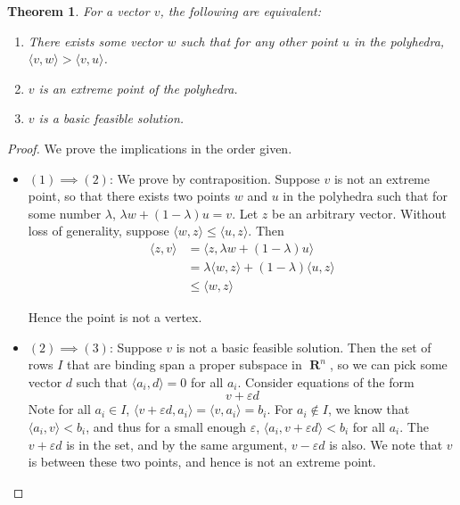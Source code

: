 \documentclass{report}
\DeclareMathOperator{\real}{\mathbf{R}}
\newtheorem{theorem}{Theorem}[chapter]
\begin{document}
    \begin{theorem}
        For a vector $v$, the following are equivalent:

        \begin{enumerate}
            \item There exists some vector $w$ such that for any other point $u$ in the polyhedra,
            $\langle v, w \rangle > \langle v, u \rangle$.
            \item $v$ is an extreme point of the polyhedra.
            \item $v$ is a basic feasible solution.
        \end{enumerate}
    \end{theorem}
    \begin{proof}
        We prove the implications in the order given.

        \begin{itemize}
            \item $(1) \implies (2)$: We prove by contraposition. Suppose $v$ is not an extreme point, so that there exists two points $w$ and $u$ in the polyhedra such that for some number $\lambda$, $\lambda w + (1 - \lambda)u = v$. Let $z$ be an arbitrary vector. Without loss of generality, suppose $\langle w, z \rangle \leq \langle u, z \rangle$. Then
            \begin{align*}
                \langle z, v \rangle &= \langle z, \lambda w + (1 - \lambda) u \rangle\\
                                     &= \lambda \langle w, z \rangle + (1 - \lambda) \langle u, z \rangle\\
                                     &\leq \langle w , z \rangle
            \end{align*}

            Hence the point is not a vertex.

            \item $(2) \implies (3)$: Suppose $v$ is not a basic feasible solution. Then the set of rows $I$ that are binding span a proper subspace in $\real^n$, so we can pick some vector $d$ such that $\langle a_i, d \rangle = 0$ for all $a_i$. Consider equations of the form
            \[ v + \varepsilon d \]
            Note for all $a_i \in I$, $\langle v + \varepsilon d, a_i \rangle = \langle v, a_i \rangle = b_i$. For $a_i \notin I$, we know that $\langle a_i, v \rangle < b_i$, and thus for a small enough $\varepsilon$, $\langle a_i, v + \varepsilon d \rangle < b_i$ for all $a_i$. The $v + \varepsilon d$ is in the set, and by the same argument, $v - \varepsilon d$ is also. We note that $v$ is between these two points, and hence is not an extreme point.


\end{itemize}
\end{proof}
\end{document}
